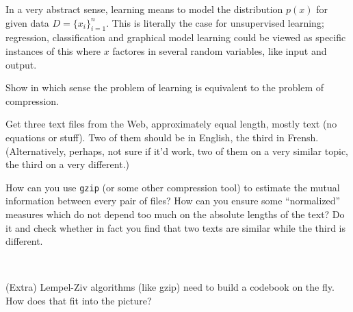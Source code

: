 
In a very abstract sense, learning means to model the distribution
$p(x)$ for given data $D=\{ x_i \}_{i=1}^n$. This is literally the
case for unsupervised learning; regression, classification and
graphical model learning could be viewed as specific instances of this
where $x$ factores in several random variables, like input and output.

Show in which sense the problem of learning is equivalent to the
problem of compression.



Get three text files from the Web, approximately equal length, mostly
text (no equations or stuff). Two of them should be in English, the
third in Frensh. (Alternatively, perhaps, not sure if it'd work, two
of them on a very similar topic, the third on a very different.)

How can you use \texttt{gzip} (or some other compression tool) to
estimate the mutual information between every pair of files? How can
you ensure some ``normalized'' measures which do not depend too much
on the absolute lengths of the text? Do it and check whether in fact
you find that two texts are similar while the third is different.

~

(Extra) Lempel-Ziv algorithms (like gzip) need to build a codebook on
the fly. How does that fit into the picture?


\exerfoot
